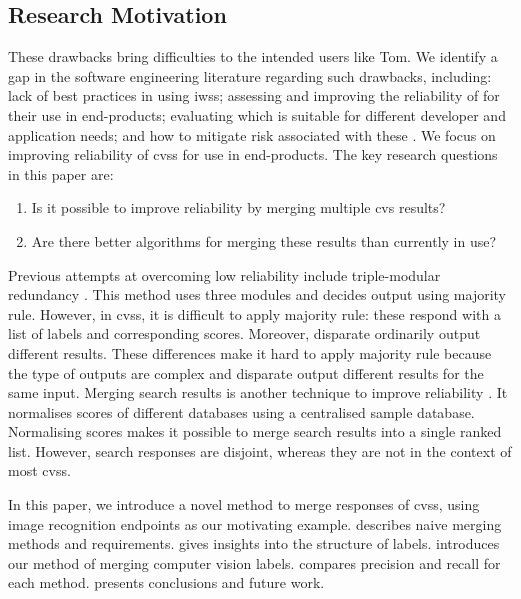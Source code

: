 \subsection{Research Motivation}

These drawbacks bring difficulties to the intended  users like Tom. We identify a gap in the software engineering literature regarding such drawbacks, including: lack of best practices in using \glspl{iws}; assessing and improving the reliability of  for their use in end-products; evaluating which  is suitable for different developer and application needs; and how to mitigate risk associated with these . We focus on improving reliability of \glspl{cvs} for use in end-products.
The key research questions in this paper are:
\begin{enumerate}[label=\textbf{RQ\arabic*:},leftmargin=3\parindent]
  \item Is it possible to improve reliability by merging multiple \gls{cvs} results?
  \item Are there better algorithms for merging these results than currently in use?
\end{enumerate}

Previous attempts at overcoming low reliability include triple-modular redundancy \citep{IBMTripleModularRedendancy}.
This method uses three modules and decides output using majority rule.
However, in \glspl{cvs}, it is difficult to apply majority rule: these  respond with a list of labels and corresponding scores.
Moreover, disparate  ordinarily output different results. These differences make it hard to apply majority rule because the type of outputs are complex and disparate  output different results for the same input.
Merging search results is another technique to improve reliability \citep{SiMergeSearchEngineResults}.
It normalises scores of different databases using a centralised sample database.
Normalising scores makes it possible to merge search results into a single ranked list.
However, search responses are disjoint, whereas they are not in the context of most \glspl{cvs}.

In this paper, we introduce a novel method to merge responses of \glspl{cvs}, using image recognition  endpoints as our motivating example.
 describes naive merging methods and requirements.
 gives insights into the structure of labels.
 introduces our method of merging computer vision labels.
 compares precision and recall for each method.
 presents conclusions and future work.

